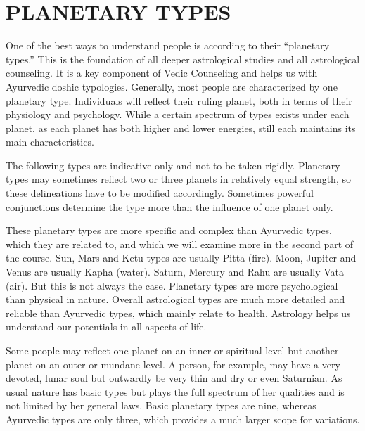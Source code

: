 \section{PLANETARY TYPES}
 

One of the best ways to understand people is according to their “planetary types.” This is the foundation of all deeper astrological studies and all astrological counseling. It is a key component of Vedic Counseling and helps us with Ayurvedic doshic typologies. Generally, most people are characterized by one planetary type. Individuals will reflect their ruling planet, both in terms of their physiology and psychology. While a certain spectrum of types exists under each planet, as each planet has both higher and lower energies, still each maintains its main characteristics.

 

The following types are indicative only and not to be taken rigidly. Planetary types may sometimes reflect two or three planets in relatively equal strength, so these delineations have to be modified accordingly. Sometimes powerful conjunctions determine the type more than the influence of one planet only.

 

These planetary types are more specific and complex than Ayurvedic types, which they are related to, and which we will examine more in the second part of the course. Sun, Mars and Ketu types are usually Pitta (fire). Moon, Jupiter and Venus are usually Kapha (water). Saturn, Mercury and Rahu are usually Vata (air). But this is not always the case. Planetary types are more psychological than physical in nature. Overall astrological types are much more detailed and reliable than Ayurvedic types, which mainly relate to health. Astrology helps us understand our potentials in all aspects of life.

 

Some people may reflect one planet on an inner or spiritual level but another planet on an outer or mundane level. A person, for example, may have a very devoted, lunar soul but outwardly be very thin and dry or even Saturnian. As usual nature has basic types but plays the full spectrum of her qualities and is not limited by her general laws. Basic planetary types are nine, whereas Ayurvedic types are only three, which provides a much larger scope for variations.

 

